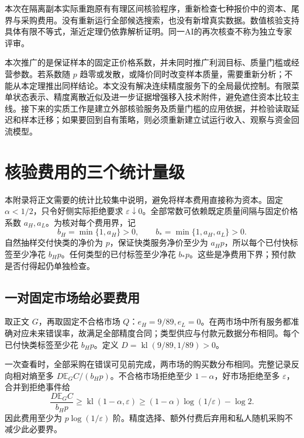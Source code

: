 \documentclass[UTF8,fontset=windows,11pt,a4paper]{ctexart}
\numberwithin{equation}{section}
\begin{document}
本次在隔离副本实际重跑原有有理区间核验程序，重新检查七种报价中的资本、尾界与采购费用。没有重新运行全部候选搜索，也没有新增真实数据。数值核验支持具体有限不等式，渐近定理仍依靠解析证明。同一AI的再次核查不称为独立专家评审。

本次推广的是保证样本的固定正价格系数，并未同时推广利润目标、质量门槛或经营参数。若系数随 $p$ 趋零或发散，或降价同时改变样本质量，需要重新分析；不能从本定理推出同样结论。本文没有解决连续精度服务下的全局最优控制。有限菜单状态表示、精度离散近似及进一步证据增强移入技术附件，避免遮住资本比较主线。接下来的实质工作是建立外部核验服务及质量门槛的应用依据，并检验读取延迟和样本迁移；如果要回到自有策略，则必须重新建立试运行收入、观察与资金回流模型。

\appendix
\section{核验费用的三个统计量级}
本附录将正文需要的统计比较集中说明，避免将样本费用直接称为资本。固定 $\alpha<1/2$，只令好侧实际拒绝要求 $\varepsilon\downarrow0$。全部常数可依赖既定质量间隔与固定价格系数 $a_H,a_L$。为核对每个费用界，记
\begin{equation}
 b_H=\min\{1,a_H\}>0,\qquad
 b_*=\min\{1,a_H,a_L\}>0.
\end{equation}
自然抽样交付快类的净价为 $p$，保证快类服务净价至少为 $a_Hp$，所以每个已付快标签至少净花 $b_Hp$。任何类型的已付标签至少净花 $b_*p$。这些是净费用下界；预付款是否付得起仍单独检查。

\subsection{一对固定市场给必要费用}
取正文 $G$，再取固定不合格市场 $Q$：$e_H=9/89,e_L=0$。在两市场中所有服务都准确对应未来错误率，故满足全部精度合同；类型供应与付款元数据分布相同。每个已付快类标签至少花 $b_Hp$。定义 $D=\operatorname{kl}(9/89,1/89)>0$。

一次查看时，全部采购在错误可见前完成，两市场的购买数分布相同。完整记录反向相对熵至多 $D\mathbb E_GC/(b_Hp)$。不合格市场拒绝至少 $1-\alpha$，好市场拒绝至多 $\varepsilon$，合并到拒绝事件给
\begin{equation}
 \frac{D\mathbb E_GC}{b_Hp}\ge\operatorname{kl}(1-\alpha,\varepsilon)
 \ge(1-\alpha)\log(1/\varepsilon)-\log2.
\end{equation}
因此费用至少为 $p\log(1/\varepsilon)$ 阶。精度选择、额外付费后弃用和私人随机采购不减少此必要界。
\end{document}
